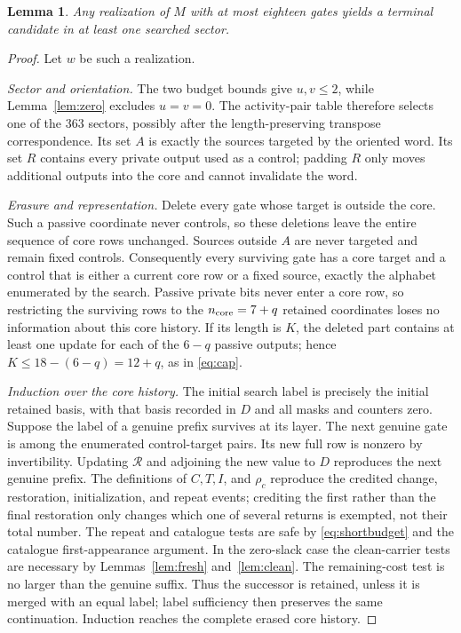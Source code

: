 \documentclass[11pt]{article}
\newtheorem{lemma}[theorem]{Lemma}
\begin{document}
\begin{lemma}\label{lem:coverage}
Any realization of $M$ with at most eighteen gates yields a terminal
candidate in at least one searched sector.
\end{lemma}
\begin{proof}
Let $w$ be such a realization.

\emph{Sector and orientation.}
The two budget bounds give $u,v\le2$, while Lemma~\ref{lem:zero} excludes
$u=v=0$. The activity-pair table therefore selects one of the 363 sectors,
possibly after the length-preserving transpose correspondence. Its set $A$
is exactly the sources targeted by the oriented word. Its set $R$ contains
every private output used as a control; padding $R$ only moves additional
outputs into the core and cannot invalidate the word.

\emph{Erasure and representation.}
Delete every gate whose target is outside the core. Such a passive coordinate
never controls, so these deletions leave the entire sequence of core rows
unchanged. Sources outside $A$ are never targeted and remain fixed controls.
Consequently every surviving gate has a core target and a control that is
either a current core row or a fixed source, exactly the alphabet enumerated
by the search. Passive private bits never enter a core row, so restricting
the surviving rows to the $n_{\rm core}=7+q$ retained coordinates loses no information
about this core history. If its length is $K$, the deleted part contains at
least one update for each of the $6-q$ passive outputs; hence
$K\le18-(6-q)=12+q$, as in \eqref{eq:cap}.

\emph{Induction over the core history.}
The initial search label is precisely the initial retained basis, with that
basis recorded in $D$ and all masks and counters zero. Suppose the label of a
genuine prefix survives at its layer. The next genuine gate is among the
enumerated control-target pairs. Its new full row is nonzero by invertibility.
Updating $\mathcal R$ and adjoining the new value to $D$ reproduces the next
genuine prefix. The definitions of $C,T,I$, and $\rho_c$ reproduce the credited
change, restoration, initialization, and repeat events; crediting the first
rather than the final restoration only changes which one of several returns
is exempted, not their total number. The repeat and catalogue tests are safe
by \eqref{eq:shortbudget} and the catalogue first-appearance argument. In the
zero-slack case the clean-carrier tests are necessary by
Lemmas~\ref{lem:fresh} and~\ref{lem:clean}. The remaining-cost test is no
larger than the genuine suffix. Thus the successor is retained, unless it is
merged with an equal label; label sufficiency then preserves the same
continuation. Induction reaches the complete erased core history.


\end{proof}
\end{document}

